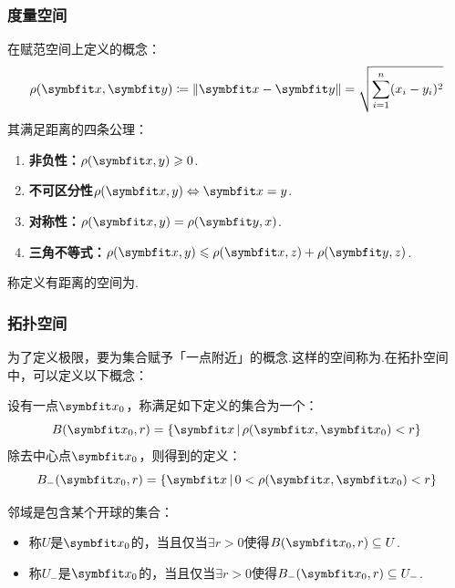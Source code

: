 \subsubsection{度量空间}
\begin{definition}
    在赋范空间上定义的概念：
    \[\rho(\vb{x},\vb{y}) \coloneq \left\|\vb{x} - \vb{y}\right\| = \sqrt{\sum_{i=1}^{n}(x_i-y_i)^2}\]
    其满足距离的四条公理：
    \begin{enumerate}[circ]
        \item \textbf{非负性：}$\rho(\vb{x,y}) \geqslant 0$.
        \item \textbf{不可区分性}$\rho(\vb{x,y})\Leftrightarrow \vb{x=y}$.
        \item \textbf{对称性：}$\rho(\vb{x,y}) = \rho(\vb{y,x})$.
        \item \textbf{三角不等式：}$\rho(\vb{x,y})\leqslant\rho(\vb{x,z}) + \rho(\vb{y,z})$.
    \end{enumerate}
    称定义有距离的空间为\!.
\end{definition}


\subsubsection{拓扑空间}
为了定义极限，要为集合赋予「一点附近」的概念.这样的空间称为\!.在拓扑空间中，可以定义以下概念：

\begin{definition}
    设有一点$\vb{x}_0$，称满足如下定义的集合为一个：
    \[B(\vb{x}_0,r) = \{\vb{x}\,|\,\rho(\vb{x},\vb{x}_0) < r\}\]
    除去中心点$\vb{x}_0$，则得到的定义：
    \[B_-(\vb{x}_0,r) = \{\vb{x}\,|\,0 < \rho(\vb{x},\vb{x}_0) < r\}\]
\end{definition}

\begin{definition}
    邻域是包含某个开球的集合：
    \begin{itemize}
        \item 称$U$是$\vb{x}_0$的，当且仅当$\exists r>0$使得$B(\vb{x}_0,r)\subseteq U$.
        \item 称$U_-$是$\vb{x}_0$的，当且仅当$\exists r>0$使得$B_-(\vb{x}_0,r)\subseteq U_-$.
    \end{itemize}
\end{definition}

